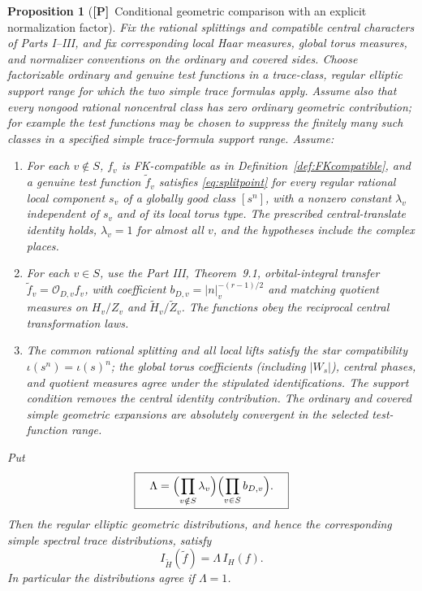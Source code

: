 \documentclass[11pt]{article}
\newcommand{\Ptag}{\textnormal{\textbf{[P]}}}
\theoremstyle{plain}
\newtheorem{proposition}[theorem]{Proposition}
\theoremstyle{definition}
\begin{document}
\begin{proposition}[\Ptag\ Conditional geometric comparison with
an explicit normalization factor]\label{prop:conditionalglobal}
Fix the rational splittings and compatible central characters
of Parts I--III, and fix \emph{corresponding} local Haar measures,
global torus measures, and normalizer conventions on the ordinary
and covered sides.  Choose factorizable ordinary and genuine test
functions in a trace-class, regular elliptic support range for
which the two simple trace formulas apply. Assume also that
\emph{every nongood rational noncentral class has zero ordinary
geometric contribution}; for example the test functions may be
chosen to suppress the finitely many such classes in a specified
simple trace-formula support range. Assume:
\begin{enumerate}[label=(\roman*)]
\item For each $v\notin S$, $f_v$ is FK-compatible as in
Definition~\ref{def:FKcompatible}, and a genuine test function
$\widetilde f_v$ satisfies \eqref{eq:splitpoint} for every regular
rational local component $s_v$ of a globally good class $[s^n]$,
with a nonzero constant $\lambda_v$ independent of $s_v$ and of
its local torus type.  The prescribed central-translate identity
holds, $\lambda_v=1$ for almost all $v$, and the hypotheses include
the complex places.
\item For each $v\in S$, use the Part III, Theorem~9.1,
orbital-integral transfer $\widetilde f_v=\mathcal O_{D,v}f_v$,
with coefficient $b_{D,v}=|n|_v^{-(r-1)/2}$ and matching quotient
measures on $H_v/Z_v$ and $\widetilde H_v/\widetilde Z_v$.
The functions obey the reciprocal central transformation laws.
\item The common rational splitting and all local lifts satisfy
the star compatibility $\iota(s^n)=\iota(s)^n$; the global torus
coefficients (including $|W_s|$), central phases, and quotient
measures agree under the stipulated identifications.  The support
condition removes the central identity contribution.  The
ordinary and covered simple geometric expansions are absolutely
convergent in the selected test-function range.
\end{enumerate}
Put
\begin{equation}\label{eq:lambda-product}
 \boxed{\quad
 \Lambda=\Bigl(\prod_{v\notin S}\lambda_v\Bigr)
          \Bigl(\prod_{v\in S}b_{D,v}\Bigr).\quad}
\end{equation}
Then the regular elliptic geometric distributions, and hence the
corresponding simple spectral trace distributions, satisfy
\begin{equation}\label{eq:globalLambda}
 \boxed{\quad I_{\widetilde H}(\widetilde f)
              =\Lambda\,I_H(f).\quad}
\end{equation}
In particular the distributions agree if $\Lambda=1$.
\end{proposition}
\end{document}
